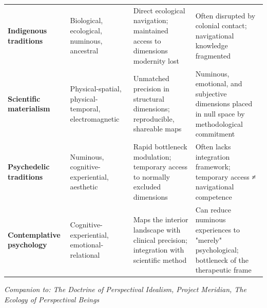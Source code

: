 \begin{longtable}{>{\raggedright\arraybackslash}p{} >{\raggedright\arraybackslash}p{} >{\raggedright\arraybackslash}p{} >{\raggedright\arraybackslash}p{}}
\textbf{Indigenous traditions} & Biological, ecological, numinous, ancestral & Direct ecological navigation; maintained access to dimensions modernity lost & Often disrupted by colonial contact; navigational knowledge fragmented \\
\textbf{Scientific materialism} & Physical-spatial, physical-temporal, electromagnetic & Unmatched precision in structural dimensions; reproducible, shareable maps & Numinous, emotional, and subjective dimensions placed in null space by methodological commitment \\
\textbf{Psychedelic traditions} & Numinous, cognitive-experiential, aesthetic & Rapid bottleneck modulation; temporary access to normally excluded dimensions & Often lacks integration framework; temporary access ≠ navigational competence \\
\textbf{Contemplative psychology} & Cognitive-experiential, emotional-relational & Maps the interior landscape with clinical precision; integration with scientific method & Can reduce numinous experiences to "merely" psychological; bottleneck of the therapeutic frame \\
\bottomrule
\end{longtable}



\bigskip\noindent\makebox[\textwidth]{\color{rulegray}\rule{5cm}{0.3pt}}\bigskip


\textit{Companion to: The Doctrine of Perspectival Idealism, Project Meridian, The Ecology of Perspectival Beings}
